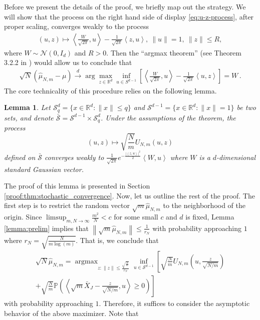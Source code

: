 \documentclass[12pt]{article}
\providecommand{\argmax}{\mathop\mathrm{arg max}} %
\newcommand{\wh}{\widehat}
\def\l{\left}
\def\r{\right}
\newcommand{\mb}{\mathbb}
\newcommand{\dotp}[2]{\left\langle#1,#2\right\rangle}
\newtheorem{lemma}{Lemma}
\theoremstyle{thmstyletwo}%
\theoremstyle{thmstylethree}%
\begin{document}
Before we present the details of the proof, we briefly map out the strategy. We will show that the process on the right hand side of display \eqref{eq:u-z-process}, after proper scaling, converges weakly to the process
\begin{align*}
    (u,z)\mapsto\dotp{\frac{W}{\sqrt{2\pi}}}{u} - \frac{1}{\sqrt{2\pi}}\dotp{z}{u}, \ \|u\|=1, \ \|z\|\leq R,
\end{align*}
where $W \sim \mathcal{N}(0,I_d)$ and $R>0$. 
Then the ``argmax theorem'' (see Theorem 3.2.2 in \cite{wellner2013weak}) would allow us to conclude that 
\begin{align*}
    \sqrt{N}\l( \wh\mu_{N,m} - \mu \r) \xrightarrow[]{d}  \arg\max_{z\in \mb R^d} \inf_{u\in S^{d-1}} \l[\dotp{\frac{W}{\sqrt{2\pi}}}{u} - \frac{1}{\sqrt{2\pi}}\dotp{u}{z} \r] = W\,.
\end{align*}
The core technicality of this procedure relies on the following lemma.
\begin{lemma}\label{thm:stochastic_convergence}
Let $\mathcal{S}^d_q = \{x \in \mb R^d: \|x\| \leq q\}$ and $\mathcal{S}^{d-1} = \{x \in \mb R^d : \|x\| = 1\}$ be two sets, and denote $\bar{\mathcal{S}} = \mathcal{S}^{d-1} \times \mathcal{S}^d_q$. Under the assumptions of the theorem, the process 
\[
(u,z) \mapsto \sqrt{\frac{N}{m}} U_{N,m}\l(u,z\r)
\]
defined on $\bar{\mathcal{S}}$ converges weakly to $\frac{1}{\sqrt{2\pi}}e^{-\frac{\l\lvert \dotp{z}{u}\r\rvert^2}{2}}\dotp{W}{u}$ where $W$ is a $d$-dimensional standard Gaussian vector.
\end{lemma}
\noindent The proof of this lemma is presented in Section \ref{proof:thm:stochastic_convergence}. Now, let us outline the rest of the proof. The first step is to restrict the random vector $\sqrt{m}\wh \mu_{N,m}$ to the neighborhood of the origin. Since $\limsup_{m,N \rightarrow \infty} \frac{m^2}{N} < c$ for some small $c$ and $d$ is fixed, Lemma \ref{lemma:prelim} implies that $\l\|\sqrt{m}\wh \mu_{N,m}\r\| \leq \frac{1}{r_N}$ with probability approaching $1$ where $r_N = \sqrt{\frac{N}{m \log(m)}}$.
That is, we conclude that
\begin{multline*}
    \sqrt{N}\wh\mu_{N,m} = \argmax_{z : \|z\| \leq \frac{\sqrt{\frac{N}{m}}}{r_N}}\inf_{u \in \mathcal{S}^{d-1}}\l[\sqrt{\frac{N}{m}} U_{N,m}\l(u, \frac{z}{\sqrt{N/m}}\r) \r.\\
    +\l. \sqrt{\frac{N}{m}} \mb P \l(\dotp{\sqrt{m}\bar X_J - \frac{z}{\sqrt{N/m}}}{u}\geq 0\r)\r]
\end{multline*}
with probability approaching $1$. Therefore, it suffices to consider the asymptotic behavior of the above maximizer. Note that
\end{document}
